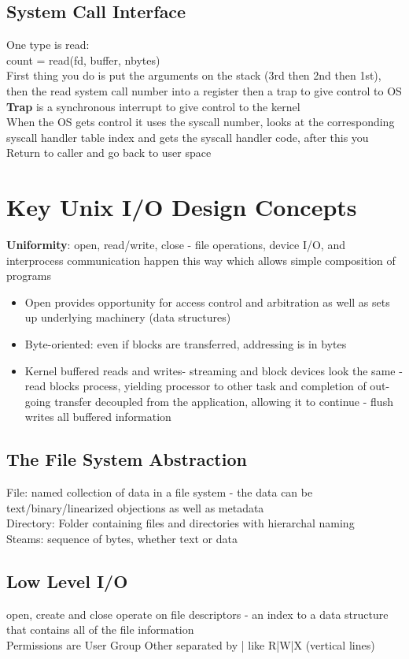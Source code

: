 \documentclass{article}
\begin{document}
\subsection{System Call Interface}
One type is read: \\
count = read(fd, buffer, nbytes) \\
First thing you do is put the arguments on the stack (3rd then 2nd then 1st), then the read system call number into a register then a trap to give control to OS \\ 
\textbf{Trap} is a synchronous interrupt to give control to the kernel \\
When the OS gets control it uses the syscall number, looks at the corresponding syscall handler table index and gets the syscall handler code, after this you Return to caller and go back to user space

\section{Key Unix I/O Design Concepts}
\textbf{Uniformity}: open, read/write, close - file operations, device I/O, and interprocess communication happen this way which allows simple composition of programs 
\begin{itemize}
\item Open provides opportunity for access control and arbitration as well as sets up underlying machinery (data structures) 
\item Byte-oriented: even if blocks are transferred, addressing is in bytes
\item Kernel buffered reads and writes- streaming and block devices look the same - read blocks process, yielding processor to other task and completion of out-going transfer decoupled from the application, allowing it to continue - flush writes all buffered information
\end{itemize}
\subsection{The File System Abstraction}
File: named collection of data in a file system - the data can be text/binary/linearized objections as well as metadata \\ 
Directory: Folder containing files and directories with hierarchal naming \\
Steams: sequence of bytes, whether text or data \\
\subsection{Low Level I/O}
open, create and close operate on file descriptors - an index to a data structure that contains all of the file information \\
Permissions are User Group Other separated by | like R|W|X (vertical lines)
\end{document}
